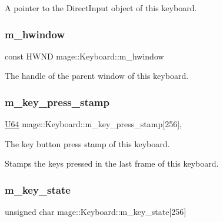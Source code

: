 A pointer to the Direct\+Input object of this keyboard. \hypertarget{classmage_1_1_keyboard_adad9c02695c121898ac578ca25dd5c9a}{}\label{classmage_1_1_keyboard_adad9c02695c121898ac578ca25dd5c9a} 
\subsubsection{\texorpdfstring{m\+\_\+hwindow}{m\_hwindow}}
{\footnotesize\ttfamily const H\+W\+ND mage\+::\+Keyboard\+::m\+\_\+hwindow\hspace{0.3cm}{\ttfamily [private]}}

The handle of the parent window of this keyboard. \hypertarget{classmage_1_1_keyboard_a4a9e80f99dfea8ac518fb451965d4047}{}\label{classmage_1_1_keyboard_a4a9e80f99dfea8ac518fb451965d4047} 
\subsubsection{\texorpdfstring{m\+\_\+key\+\_\+press\+\_\+stamp}{m\_key\_press\_stamp}}
{\footnotesize\ttfamily \hyperlink{namespacemage_a6672cf3c861707ce4a3235a3eb43941d}{U64} mage\+::\+Keyboard\+::m\+\_\+key\+\_\+press\+\_\+stamp\mbox{[}256\mbox{]}\hspace{0.3cm}{\ttfamily [mutable]}, {\ttfamily [private]}}

The key button press stamp of this keyboard.

Stamps the keys pressed in the last frame of this keyboard. \hypertarget{classmage_1_1_keyboard_a7499df459499f5addd50507ea1e2358c}{}\label{classmage_1_1_keyboard_a7499df459499f5addd50507ea1e2358c} 
\subsubsection{\texorpdfstring{m\+\_\+key\+\_\+state}{m\_key\_state}}
{\footnotesize\ttfamily unsigned char mage\+::\+Keyboard\+::m\+\_\+key\+\_\+state\mbox{[}256\mbox{]}\hspace{0.3cm}{\ttfamily [private]}}

